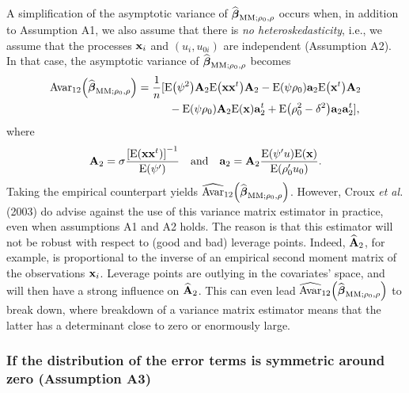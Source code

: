 A simplification of the asymptotic variance of $\sthat{\boldsymbol\beta%
}_{\mathrm{MM};\rho_{0},\rho}$ occurs when, in addition to Assumption A1, we
also assume that there is \emph{no heteroskedasticity}, i.e., we assume that
the processes $\mathbf x_{i}$ and $\left(  u_{i},u_{0i}\right)  $ are
independent (Assumption A2). In that case, the asymptotic variance of
$\widehat{\boldsymbol\beta}_{\mathrm{MM};\rho_{0},\rho}$ becomes
\begin{align*}
\mathrm{Avar}_{12}\left(  \sthat{\boldsymbol\beta}_{\mathrm{MM};\rho
_{0},\rho}\right)   &  =\frac{1}{n}[\mathrm{E}\left(  \psi^{2}\right)
\mathbf{A}_{2}\mathrm{E}\left(  \mathbf{xx}^{t}\right)  \mathbf{A}%
_{2}-\mathrm{E}\left(  \psi\rho_{0}\right)  \mathbf{a}_{2}\mathrm{E}\left(
\stvec{x}^{t}\right)  \mathbf{A}_{2}\\
&  \hspace{0in}\hspace{1cm}-\mathrm{E}\left(  \psi\rho_{0}\right)
\mathbf{A}_{2}\mathrm{E}\left(  \stvec{x}\right)  \mathbf{a}_{2}%
^{t}+\mathrm{E}\left(  \rho_{0}^{2}-\delta^{2}\right)  \mathbf{a}%
_{2}\mathbf{a}_{2}^{t}],
\end{align*}
where
\[
\mathbf{A}_{2}=\sigma\frac{\left[  \mathrm{E}\left(  \mathbf{xx}^{t}\right)
\right]  ^{-1}}{\mathrm{E}\left(  \psi^{\prime}\right)  }\quad\text{and\quad
}\mathbf{a}_{2}=\mathbf{A}_{2}\frac{\mathrm{E}\left(  \psi^{\prime}u\right)
\mathrm{E}\left(  \stvec{x}\right)  }{\mathrm{E}\left(  \rho_{0}^{\prime
}u_{0}\right)  }.
\]
Taking the empirical counterpart yields $\sthat{\mathrm{Avar}}_{12}\left(
\sthat{\boldsymbol\beta}_{\mathrm{MM};\rho_{0},\rho}\right)  $. However,
Croux \textit{et al.} (2003) do advise against the use of this variance matrix
estimator in practice, even when assumptions A1 and A2 holds. The reason is
that this estimator will not be robust with respect to (good and bad) leverage
points. Indeed, $\widehat{\mathbf{A}}_{2}$, for example, is proportional to
the inverse of an empirical second moment matrix of the observations
$\mathbf x_{i}$. Leverage points are outlying in the covariates' space, and
will then have a strong influence on $\widehat{\mathbf{A}}_{2}$. This can even
lead $\sthat{\mathrm{Avar}}_{12}\left(  \sthat{\boldsymbol\beta%
}_{\mathrm{MM};\rho_{0},\rho}\right)  $ to break down, where breakdown of a
variance matrix estimator means that the latter has a determinant close to
zero or enormously large.

\subsubsection{If the distribution of the error terms is symmetric around zero (Assumption A3)}

